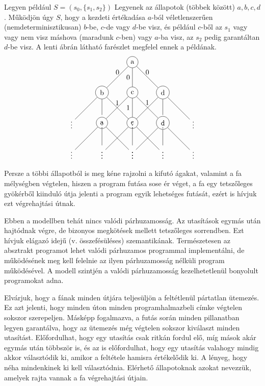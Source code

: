 \documentclass{article}
\begin{document}
Legyen például $S = (s_0, \lbrace s_1, s_2\rbrace)$ Legyenek az állapotok (többek között) $a,b,c,d$. Működjön úgy $S$, hogy a kezdeti értékadása $a$-ból véletlenszerűen (nemdeterminisztikusan) $b$-be, $c$-de vagy $d$-be visz, és például $c$-ből az $s_1$ vagy vagy nem visz máshova (maradunk $c$-ben) vagy $a$-ba visz, az $s_2$ pedig garantáltan $d$-be visz. A lenti ábrán látható farészlet megfelel ennek a példának.
\\
\begin{align*}
\begin{tikzpicture}
\node [circle,draw] (1){a}
  child {node [circle,draw] (2) {b}
      child {node {$\vdots$}}
      child {node {$\vdots$}}
      child {node {$\vdots$}}
      edge from parent node[above] {0}
  }
  child {node [circle,draw] (3) {c}
      child {node[circle,draw] {a}
	      child {node {$\vdots$}}
	      child {node {$\vdots$}}
    	  child {node {$\vdots$}}
		  edge from parent node[above] {1}    
      }
      child {node[circle,draw] {c}
            child {node {$\vdots$}}
            child {node {$\vdots$}}
            child {node {$\vdots$}}
  		    edge from parent node[left] {1} 
      }  
      child {node[circle,draw] {d}
	      child {node {$\vdots$}}
	      child {node {$\vdots$}}
          child {node {$\vdots$}}
          edge from parent node[above] {1}
      }
      edge from parent node[left] {0}
  }
  child {node [circle,draw] (4) {d}
      child {node {$\vdots$}}
      child {node {$\vdots$}}
      child {node {$\vdots$}}
      edge from parent node[above] {0}
};
\end{tikzpicture}
\end{align*}
Persze a többi állapotból is meg kéne rajzolni a kifutó ágakat, valamint a fa mélységben végtelen, hiszen a program futása sose ér véget, a fa egy tetszőleges gyökérből kiinduló útja jelenti a program egyik lehetséges futását, ezért is hívjuk ezt végrehajtási útnak.

Ebben a modellben tehát nincs valódi párhuzamosság. Az utasítások egymás után hajtódnak végre, de bizonyos megkötések mellett tetszőleges sorrendben. Ezt hívjuk elágazó idejű (v. összefésüléses) szemantikának. Természetesen az absztrakt programot lehet valódi párhuzamos programmal implementálni, de működésének meg kell felelnie az ilyen párhuzamosság nélküli program működésével. A modell szintjén a valódi párhuzamosság kezelhetetlenül bonyolult programokat adna.

Elvárjuk, hogy a fának minden útjára teljesüljön a feltétlenül pártatlan ütemezés. Ez azt jelenti, hogy minden úton minden programhalmazbeli címke végtelen sokszor szerepeljen. Másképp fogalmazva, a futás során minden pillanatban legyen garantálva, hogy az ütemezés még végtelen sokszor kiválaszt minden utasítást. Előfordulhat, hogy egy utasítás csak ritkán fordul elő, míg mások akár egymás után többször is, és az is előfordulhat, hogy egy utasítás valahogy mindig akkor választódik ki, amikor a feltétele hamisra értékelődik ki. A lényeg, hogy néha mindenkinek ki kell választódnia. Elérhető állapotoknak azokat nevezzük, amelyek rajta vannak a fa végrehajtási útjain.
\end{document}
